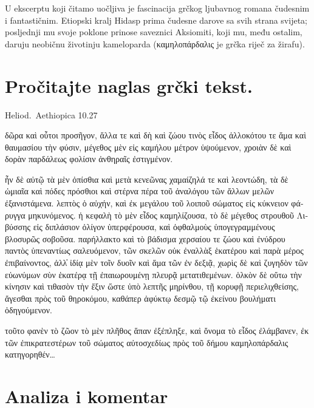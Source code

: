U ekscerptu koji čitamo uočljiva je fascinacija grčkog ljubavnog romana čudesnim i fantastičnim. Etiopski kralj Hidasp prima čudesne darove sa svih strana svijeta; posljednji mu svoje poklone prinose saveznici Aksiomiti, koji mu, među ostalim, daruju neobičnu životinju kameloparda (\textgreek[variant=ancient]{καμηλοπάρδαλις} je grčka riječ za žirafu).




\section*{Pročitajte naglas grčki tekst.}

Heliod.\ Aethiopica 10.27

\medskip


{\large

\begin{greek}

\noindent δῶρα καὶ οὗτοι προσῆγον, ἄλλα τε καὶ δὴ καὶ ζώου τινὸς εἶδος ἀλλοκότου τε ἅμα καὶ θαυμασίου τὴν φύσιν, μέγεθος μὲν εἰς καμήλου μέτρον ὑψούμενον, χροιὰν δὲ καὶ δορὰν παρδάλεως φολίσιν ἀνθηραῖς ἐστιγμένον. 

\noindent ἦν δὲ αὐτῷ τὰ μὲν ὀπίσθια καὶ μετὰ κενεῶνας χαμαίζηλά τε καὶ λεοντώδη, τὰ δὲ ὠμιαῖα καὶ πόδες πρόσθιοι καὶ στέρνα πέρα τοῦ ἀναλόγου τῶν ἄλλων μελῶν ἐξανιστάμενα. λεπτὸς ὁ αὐχήν, καὶ ἐκ μεγάλου τοῦ λοιποῦ σώματος εἰς κύκνειον φάρυγγα μηκυνόμενος. ἡ κεφαλὴ τὸ μὲν εἶδος καμηλίζουσα, τὸ δὲ μέγεθος στρουθοῦ Λιβύσσης εἰς διπλάσιον ὀλίγον ὑπερφέρουσα, καὶ ὀφθαλμοὺς ὑπογεγραμμένους βλοσυρῶς σοβοῦσα. παρήλλακτο καὶ τὸ βάδισμα χερσαίου τε ζώου καὶ ἐνύδρου παντὸς ὑπεναντίως σαλευόμενον, τῶν σκελῶν οὐκ ἐναλλὰξ ἑκατέρου καὶ παρὰ μέρος ἐπιβαίνοντος, ἀλλ̓ ἰδίᾳ μὲν τοῖν δυοῖν καὶ ἅμα τῶν ἐν δεξιᾷ, χωρὶς δὲ καὶ ζυγηδὸν τῶν εὐωνύμων σὺν ἑκατέρᾳ τῇ ἐπαιωρουμένῃ πλευρᾷ μετατιθεμένων. ὁλκὸν δὲ οὕτω τὴν κίνησιν καὶ τιθασὸν τὴν ἕξιν ὥστε ὑπὸ λεπτῆς μηρίνθου, τῇ κορυφῇ περιελιχθείσης, ἄγεσθαι πρὸς τοῦ θηροκόμου, καθάπερ ἀφύκτῳ δεσμῷ τῷ ἐκείνου βουλήματι ὁδηγούμενον. 

\noindent τοῦτο φανὲν τὸ ζῶον τὸ μὲν πλῆθος ἅπαν ἐξέπληξε, καὶ ὄνομα τὸ εἶδος ἐλάμβανεν, ἐκ τῶν ἐπικρατεστέρων τοῦ σώματος αὐτοσχεδίως πρὸς τοῦ δήμου καμηλοπάρδαλις κατηγορηθέν\dots


\end{greek}

}


\section*{Analiza i komentar}


